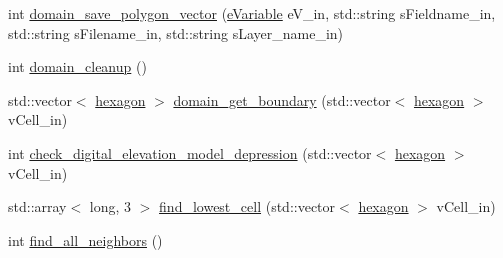 \begin{DoxyCompactItemize}
\item 
int \hyperlink{classhexwatershed_1_1domain_a4f5a5fc8ad942cea417b505f85749f30}{domain\-\_\-save\-\_\-polygon\-\_\-vector} (\hyperlink{domain_8h_aab5e06ddc3c042f4ed3acef47abe0b24}{e\-Variable} e\-V\-\_\-in, std\-::string s\-Fieldname\-\_\-in, std\-::string s\-Filename\-\_\-in, std\-::string s\-Layer\-\_\-name\-\_\-in)
\item 
int \hyperlink{classhexwatershed_1_1domain_a294e571887cc38da0a683ed5abcf41e8}{domain\-\_\-cleanup} ()
\item 
std\-::vector$<$ \hyperlink{classhexwatershed_1_1hexagon}{hexagon} $>$ \hyperlink{classhexwatershed_1_1domain_a319189008e11abaad96a2a11010cff33}{domain\-\_\-get\-\_\-boundary} (std\-::vector$<$ \hyperlink{classhexwatershed_1_1hexagon}{hexagon} $>$ v\-Cell\-\_\-in)
\item 
int \hyperlink{classhexwatershed_1_1domain_a5ffef533f8ad17241ff427bc5aa87fdf}{check\-\_\-digital\-\_\-elevation\-\_\-model\-\_\-depression} (std\-::vector$<$ \hyperlink{classhexwatershed_1_1hexagon}{hexagon} $>$ v\-Cell\-\_\-in)
\item 
std\-::array$<$ long, 3 $>$ \hyperlink{classhexwatershed_1_1domain_ad2407e609e3ca92ae69de93b7c46f6e8}{find\-\_\-lowest\-\_\-cell} (std\-::vector$<$ \hyperlink{classhexwatershed_1_1hexagon}{hexagon} $>$ v\-Cell\-\_\-in)
\item 
int \hyperlink{classhexwatershed_1_1domain_a87908e456a8024f9f692ff581c59b4e2}{find\-\_\-all\-\_\-neighbors} ()
\end{DoxyCompactItemize}

